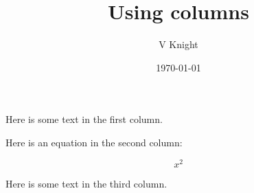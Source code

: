 \documentclass{article}
\title{Using columns}
\author{V Knight}
\date{\today}
\begin{document}
\maketitle

\begin{multicols}{3}

    Here is some text in the first column.

    \columnbreak

    Here is an equation in the second column:

    \[
        x ^ 2
    \]

    \columnbreak

    Here is some text in the third column.

\end{multicols}
\end{document}
